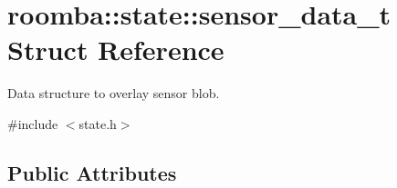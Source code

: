 \hypertarget{structroomba_1_1state_1_1sensor__data__t}{\section{roomba\+:\+:state\+:\+:sensor\+\_\+data\+\_\+t Struct Reference}
\label{structroomba_1_1state_1_1sensor__data__t}
}


Data structure to overlay sensor blob.  




{\ttfamily \#include $<$state.\+h$>$}

\subsection*{Public Attributes}
